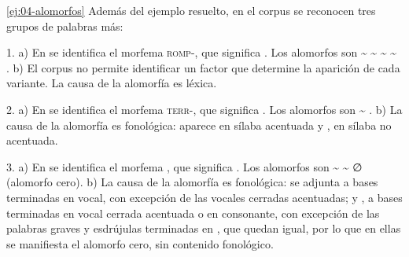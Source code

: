 \begin{solucion}{\ref{ej:04-alomorfos}}
Además del ejemplo resuelto, en el corpus se reconocen tres grupos de palabras
más:

1. a) En  se identifica el morfema \textsc{romp-}, que significa . Los alomorfos son 
\textasciitilde{}  \textasciitilde{}  \textasciitilde{}
 \textasciitilde{} . b) El corpus no permite identificar
un factor que determine la aparición de cada variante. La causa de la alomorfía
es léxica.

2. a) En  se identifica el morfema \textsc{terr-}, que
significa . Los alomorfos son 
\textasciitilde{} . b) La causa de la alomorfía es fonológica:
 aparece en sílaba acentuada y , en sílaba no acentuada.

3. a) En  se identifica el
morfema , que significa . Los alomorfos son 
\textasciitilde{}  \textasciitilde{} ∅ (alomorfo cero). b) La causa de
la alomorfía es fonológica:  se adjunta a bases terminadas en vocal, con
excepción de las vocales cerradas acentuadas; y , a bases terminadas en
vocal cerrada acentuada o en consonante, con excepción de las palabras graves y
esdrújulas terminadas en , que quedan igual, por lo que en ellas se
manifiesta el alomorfo cero, sin contenido fonológico.
\end{solucion}

